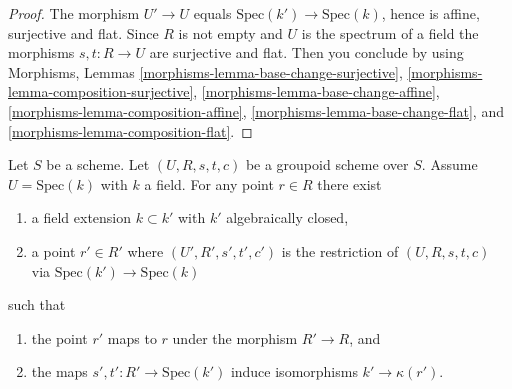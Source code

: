 \begin{proof}
The morphism $U' \to U$ equals $\text{Spec}(k') \to \text{Spec}(k)$,
hence is affine, surjective and flat. Since $R$ is not empty and $U$ is the
spectrum of a field the morphisms $s, t : R \to U$ are surjective and flat.
Then you conclude by using
Morphisms, Lemmas \ref{morphisms-lemma-base-change-surjective},
\ref{morphisms-lemma-composition-surjective},
\ref{morphisms-lemma-base-change-affine},
\ref{morphisms-lemma-composition-affine},
\ref{morphisms-lemma-base-change-flat}, and
\ref{morphisms-lemma-composition-flat}.
\end{proof}

\begin{lemma}
\label{lemma-groupoid-on-field-explain-points}
Let $S$ be a scheme. Let $(U, R, s, t, c)$ be a groupoid scheme
over $S$. Assume $U = \text{Spec}(k)$ with $k$ a field.
For any point $r \in R$ there exist
\begin{enumerate}
\item a field extension $k \subset k'$ with $k'$ algebraically closed,
\item a point $r' \in R'$ where $(U', R', s', t', c')$ is the
restriction of $(U, R, s, t, c)$ via $\text{Spec}(k') \to \text{Spec}(k)$
\end{enumerate}
such that
\begin{enumerate}
\item the point $r'$ maps to $r$ under the morphism $R' \to R$, and
\item the maps $s', t' : R' \to \text{Spec}(k')$ induce isomorphisms
$k' \to \kappa(r')$.
\end{enumerate}
\end{lemma}

